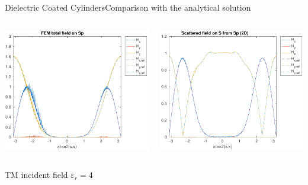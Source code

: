 \begin{frame}[allowframebreaks]{Dielectric Coated Cylinders}{Comparison with the analytical solution }
\begin{columns}
      \includegraphics[width=\linewidth]{results/TM/H_Sp.pdf}

      \includegraphics[width=\linewidth]{results/TM/H_S.pdf}
      
    \end{columns}
    
    \framebreak
        
    \hfill TM incident field $\varepsilon_r=4$ \hfill\mbox{}


\end{frame}
